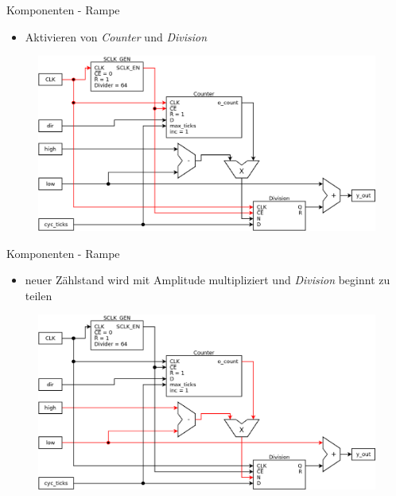\documentclass[11pt]{beamer}
\begin{document}
\begin{frame}{Komponenten - Rampe}
  \begin{itemize}
    \item Aktivieren von \emph{Counter} und \emph{Division}
  \end{itemize}
  \begin{figure}
    \includegraphics[scale=0.28]{ramp_step1}
  \end{figure}
\end{frame}

\begin{frame}{Komponenten - Rampe}
  \begin{itemize}
    \item neuer Zählstand wird mit Amplitude multipliziert und \emph{Division} beginnt zu teilen
  \end{itemize}
  \begin{figure}
    \includegraphics[scale=0.28]{ramp_step2}
  \end{figure}
\end{frame}
\end{document}
